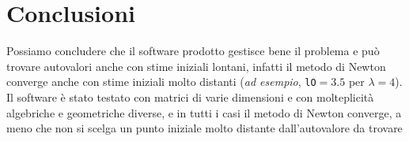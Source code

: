 \documentclass[12pt]{article}
\begin{document}
    \section{Conclusioni}
    Possiamo concludere che il software prodotto gestisce bene il problema e può trovare autovalori anche con stime iniziali lontani, infatti il metodo di Newton converge anche con stime iniziali molto distanti (\textit{ad esempio}, \texttt{lO}$= 3.5$ per $\lambda = 4$). \\ 
    Il software è stato testato con matrici di varie dimensioni e con molteplicità algebriche e geometriche diverse, e in tutti i casi il metodo di Newton converge, a meno che non si scelga un punto iniziale molto distante dall'autovalore da trovare\\
\end{document}
